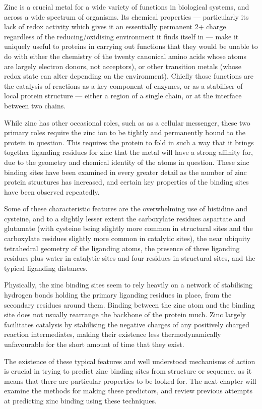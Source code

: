 Zinc is a crucial metal for a wide variety of functions in biological systems, and across a wide spectrum of organisms. Its chemical properties --- particularly its lack of redox activity which gives it an essentially permanent 2+ charge regardless of the reducing/oxidising environment it finds itself in --- make it uniquely useful to proteins in carrying out functions that they would be unable to do with either the chemistry of the twenty canonical amino acids whose atoms are largely electron donors, not acceptors), or other transition metals (whose redox state can alter depending on the environment). Chiefly those functions are the catalysis of reactions as a key component of enzymes, or as a stabiliser of local protein structure --- either a region of a single chain, or at the interface between two chains.

While zinc has other occasional roles, such as as a cellular messenger, these two primary roles require the zinc ion to be tightly and permanently bound to the protein in question. This requires the protein to fold in such a way that it brings together liganding residues for zinc that the metal will have a strong affinity for, due to the geometry and chemical identity of the atoms in question. These zinc binding sites have been examined in every greater detail as the number of zinc protein structures has increased, and certain key properties of the binding sites have been observed repeatedly.


Some of these characteristic features are the overwhelming use of histidine and cysteine, and to a slightly lesser extent the carboxylate residues aspartate and glutamate (with cysteine being slightly more common in structural sites and the carboxylate residues slightly more common in catalytic sites), the near ubiquity tetrahedral geometry of the liganding atoms, the presence of three liganding residues plus water in catalytic sites and four residues in structural sites, and the typical liganding distances.

Physically, the zinc binding sites seem to rely heavily on a network of stabilising hydrogen bonds holding the primary liganding residues in place, from the secondary residues around them. Binding between the zinc atom and the binding site does not usually rearrange the backbone of the protein much. Zinc largely facilitates catalysis by stabilising the negative charges of any positively charged reaction intermediates, making their existence less thermodynamically unfavourable for the short amount of time that they exist.

The existence of these typical features and well understood mechanisms of action is crucial in trying to predict zinc binding sites from structure or sequence, as it means that there are particular properties to be looked for. The next chapter will examine the methods for making these predictors, and review previous attempts at predicting zinc binding using these techniques.


